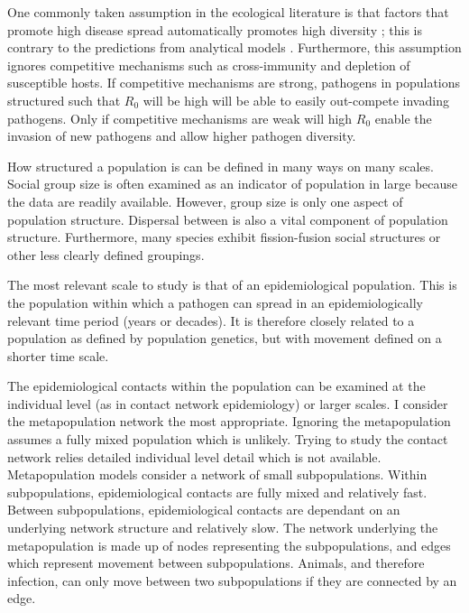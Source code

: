 One commonly taken assumption in the ecological literature is that factors that promote high disease spread automatically promotes high diversity \cite{nunn2003comparative, morand2000wormy, poulin2014parasite, poulin2000diversity, altizer2003social}; this is contrary to the predictions from analytical models \cite{qiu2013vector, allen2004sis, nunes2006localized}. 
Furthermore, this assumption ignores competitive mechanisms such as cross-immunity and depletion of susceptible hosts.
If competitive mechanisms are strong, pathogens in populations structured such that $R_0$ will be high will be able to easily out-compete invading pathogens.
Only if competitive mechanisms are weak will high $R_0$  enable the invasion of new pathogens and allow higher pathogen diversity.


How structured a population is can be defined in many ways on many scales.
Social group size is often examined as an indicator of population in large because the data are readily available.
However, group size is only one aspect of population structure.
Dispersal between is also a vital component of population structure.
Furthermore, many species exhibit fission-fusion social structures or other less clearly defined groupings.

The most relevant scale to study is that of an epidemiological population.
This is the population within which a pathogen can spread in an epidemiologically relevant time period (years or decades).
It is therefore closely related to a population as defined by population genetics, but with movement defined on a shorter time scale.

The epidemiological contacts within the population can be examined at the individual level (as in contact network epidemiology) or larger scales.
I consider the metapopulation network the most appropriate.
Ignoring the metapopulation assumes a fully mixed population which is unlikely.
Trying to study the contact network relies detailed individual level detail which is not available.
Metapopulation models consider a network of small subpopulations. 
Within subpopulations, epidemiological contacts are fully mixed and relatively fast.
Between subpopulations, epidemiological contacts are dependant on an underlying network structure and relatively slow.
The network underlying the metapopulation is made up of nodes representing the subpopulations, and edges which represent movement between subpopulations.
Animals, and therefore infection, can only move between two subpopulations if they are connected by an edge.

